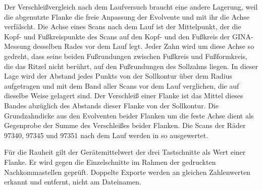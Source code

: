 Der Verschleißvergleich nach dem Laufversuch braucht eine andere Lagerung, weil die abgenutzte Flanke die freie Anpassung der Evolvente und mit ihr die Achse verfälscht. Die Achse eines Scans nach dem Lauf ist der Mittelpunkt, der die Kopf- und Fußkreispunkte des Scans auf den Kopf- und den Fußkreis der GINA-Messung desselben Rades vor dem Lauf legt. Jeder Zahn wird um diese Achse so gedreht, dass seine beiden Fußrundungen zwischen Fußkreis und Fußformkreis, die das Ritzel nicht berührt, auf den Fußrundungen des Sollzahns liegen. In dieser Lage wird der Abstand jedes Punkts von der Sollkontur über dem Radius aufgetragen und mit dem Band aller Scans vor dem Lauf verglichen, die auf dieselbe Weise gelagert sind. Der Verschleiß einer Flanke ist das Mittel dieses Bandes abzüglich des Abstands dieser Flanke von der Sollkontur. Die Grundzahndicke aus den Evolventen beider Flanken um die feste Achse dient als Gegenprobe der Summe des Verschleißes beider Flanken. Die Scans der Räder 97340, 97345 und 97351 nach dem Lauf werden in  so ausgewertet.

Für die Rauheit gilt der Gerätemittelwert der drei Tastschnitte als Wert einer Flanke. Er wird gegen die Einzelschnitte im Rahmen der gedruckten Nachkommastellen geprüft. Doppelte Exporte werden an gleichen Zahlenwerten erkannt und entfernt, nicht am Dateinamen.

